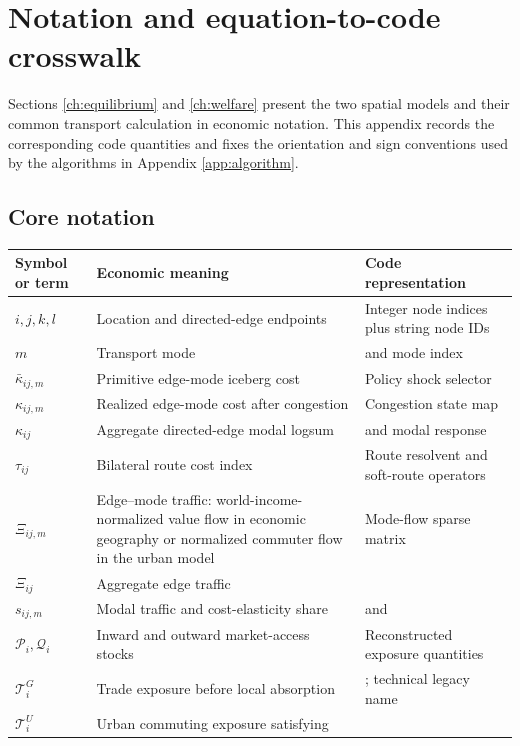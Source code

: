 \section{Notation and equation-to-code crosswalk}
\label{app:crosswalk}

Sections \ref{ch:equilibrium} and \ref{ch:welfare} present the two spatial
models and their common transport calculation in economic notation. This
appendix records the corresponding code quantities and fixes the
orientation and sign conventions used by the algorithms in Appendix
\ref{app:algorithm}.

\subsection{Core notation}

\begin{longtable}{L{0.18\textwidth}L{0.42\textwidth}L{0.31\textwidth}}
\toprule
Symbol or term & Economic meaning & Code representation \\
\midrule
\endhead
\(i,j,k,l\) & Location and directed-edge endpoints & Integer node indices plus
string node IDs \\
\(m\) & Transport mode &  and mode index \\
\(\bar\kappa_{ij,m}\) & Primitive edge-mode iceberg cost & Policy shock
selector \\
\(\kappa_{ij,m}\) & Realized edge-mode cost after congestion & Congestion
state map \\
\(\kappa_{ij}\) & Aggregate directed-edge modal logsum &  and
modal response \\
\(\tau_{ij}\) & Bilateral route cost index & Route resolvent and soft-route
operators \\
\(\Xi_{ij,m}\) & Edge--mode traffic: world-income-normalized value flow in
economic geography or normalized commuter flow in the urban model &
Mode-flow sparse matrix \\
\(\Xi_{ij}\) & Aggregate edge traffic &  \\
\(s_{ij,m}\) & Modal traffic and cost-elasticity share & 
and  \\
\(\mathcal P_i,\mathcal Q_i\) & Inward and outward market-access stocks &
Reconstructed exposure quantities \\
\(\mathcal T_i^G\) & Trade exposure before local absorption &
; technical legacy name \\
\(\mathcal T_i^U\) & Urban commuting exposure satisfying

\end{longtable}
